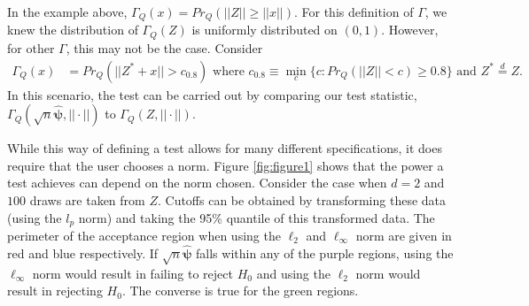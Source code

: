 \documentclass{article}
\newcommand{\rvv}{Z}
\newcommand{\distv}{Q}
\begin{document}
In the example above, $\Gamma_\distv(x) = Pr_\distv\left(||\rvv|| \geq ||x|| \right)$.  For this definition of $\Gamma$, we knew the distribution of $\Gamma_\distv(\rvv)$ is uniformly distributed on $(0, 1)$.  However, for other $\Gamma$, this may not be the case. Consider 
\begin{align*}
	\Gamma_\distv(x) &= Pr_\distv(||\rvv^* + x|| > c_{0.8})  \text{ where }  c_{0.8} \equiv \min_{c}\{c : Pr_\distv(||\rvv|| < c) \geq 0.8 \} \text{ and } \rvv^* \overset{d}{=} \rvv.
\end{align*}
In this scenario, the test can be carried out by comparing our test statistic, $\Gamma_\distv(\sqrt{n}\hat{\boldsymbol{\psi}}, ||\cdot||)$ to $\Gamma_\distv(\rvv, ||\cdot||).$



While this way of defining a test allows for many different specifications, it does require that the user chooses a norm.  Figure \ref{fig:figure1} shows that the power a test achieves can depend on the norm chosen.  Consider the case when $d = 2$ and $100$ draws are taken from $Z$.  Cutoffs can be obtained by transforming these data (using the $l_p$ norm) and taking the 95\% quantile of this transformed data. The perimeter of the acceptance region when using the $\ell_2$ and $\ell_{\infty}$ norm are given in red and blue respectively. If $\sqrt{n}\hat{\boldsymbol{\psi}}$ falls within any of the purple regions, using the $\ell_\infty$ norm would result in failing to reject $H_0$ and using the $\ell_2$ norm would result in rejecting $H_0$.  The converse is true for the green regions.  
\end{document}
